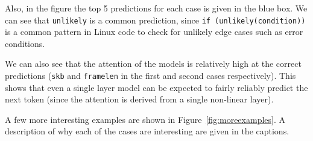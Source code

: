 Also, in the figure the top 5 predictions for each case is given in the blue
box. We can see that {\tt unlikely} is a common prediction, since {\tt if
(unlikely(condition))} is a common pattern in Linux code to check for unlikely
edge cases such as error conditions.

We can also see that the attention of the models is relatively high at the
correct predictions ({\tt skb} and {\tt framelen} in the first and second cases
respectively). This shows that even a single layer model can be expected to
fairly reliably predict the next token (since the attention is derived from a
single non-linear layer).

A few more interesting examples are shown in Figure~\ref{fig:moreexamples}. A
description of why each of the cases are interesting are given in the captions.

